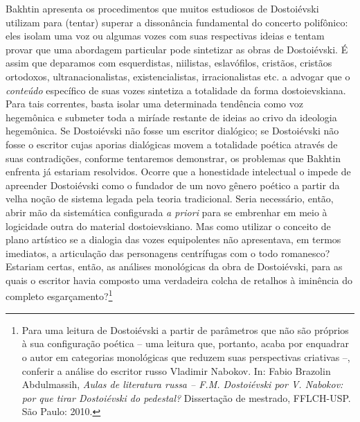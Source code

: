 Bakhtin apresenta os procedimentos que muitos estudiosos de Dostoiévski
utilizam para (tentar) superar a dissonância fundamental do concerto
polifônico: eles isolam uma voz ou algumas vozes com suas respectivas
ideias e tentam provar que uma abordagem particular pode sintetizar as
obras de Dostoiévski. É assim que deparamos com esquerdistas, niilistas,
eslavófilos, cristãos, cristãos ortodoxos, ultranacionalistas,
existencialistas, irracionalistas etc. a advogar que o \emph{conteúdo}
específico de suas vozes sintetiza a totalidade da forma dostoievskiana.
Para tais correntes, basta isolar uma determinada tendência como voz
hegemônica e submeter toda a miríade restante de ideias ao crivo da
ideologia hegemônica. Se Dostoiévski não fosse um escritor dialógico; se
Dostoiévski não fosse o escritor cujas aporias dialógicas movem a
totalidade poética através de suas contradições, conforme tentaremos
demonstrar, os problemas que Bakhtin enfrenta já estariam resolvidos.
Ocorre que a honestidade intelectual o impede de apreender Dostoiévski
como o fundador de um novo gênero poético a partir da velha noção de
sistema legada pela teoria tradicional. Seria necessário, então, abrir
mão da sistemática configurada \emph{a priori} para se embrenhar em meio
à logicidade outra do material dostoievskiano. Mas como utilizar o
conceito de plano artístico se a dialogia das vozes equipolentes não
apresentava, em termos imediatos, a articulação das personagens
centrífugas com o todo romanesco? Estariam certas, então, as análises
monológicas da obra de Dostoiévski, para as quais o escritor havia
composto uma verdadeira colcha de retalhos à iminência do completo
esgarçamento?\footnote{Para uma leitura de Dostoiévski a partir de
  parâmetros que não são próprios à sua configuração poética -- uma
  leitura que, portanto, acaba por enquadrar o autor em categorias
  monológicas que reduzem suas perspectivas criativas --, conferir a
  análise do escritor russo Vladimir Nabokov. In: Fabio Brazolin
  Abdulmassih, \emph{Aulas de literatura russa -- F.M. Dostoiévski por
  V. Nabokov: por que tirar Dostoiévski do pedestal?} Dissertação de
  mestrado, FFLCH-USP. São Paulo: 2010.}


